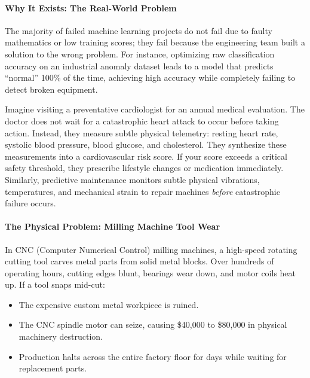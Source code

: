 \paragraph{Why It Exists: The Real-World Problem}
The majority of failed machine learning projects do not fail due to faulty mathematics or low training scores; they fail because the engineering team built a solution to the wrong problem. For instance, optimizing raw classification accuracy on an industrial anomaly dataset leads to a model that predicts ``normal'' 100\% of the time, achieving high accuracy while completely failing to detect broken equipment.

\begin{analogy}
Imagine visiting a preventative cardiologist for an annual medical evaluation. The doctor does not wait for a catastrophic heart attack to occur before taking action. Instead, they measure subtle physical telemetry: resting heart rate, systolic blood pressure, blood glucose, and cholesterol. They synthesize these measurements into a cardiovascular risk score. If your score exceeds a critical safety threshold, they prescribe lifestyle changes or medication immediately. Similarly, predictive maintenance monitors subtle physical vibrations, temperatures, and mechanical strain to repair machines \textit{before} catastrophic failure occurs.
\end{analogy}

\paragraph{The Physical Problem: Milling Machine Tool Wear}
In CNC (Computer Numerical Control) milling machines, a high-speed rotating cutting tool carves metal parts from solid metal blocks. Over hundreds of operating hours, cutting edges blunt, bearings wear down, and motor coils heat up. If a tool snaps mid-cut:
\begin{itemize}
    \item The expensive custom metal workpiece is ruined.
    \item The CNC spindle motor can seize, causing \$40,000 to \$80,000 in physical machinery destruction.
    \item Production halts across the entire factory floor for days while waiting for replacement parts.
\end{itemize}

